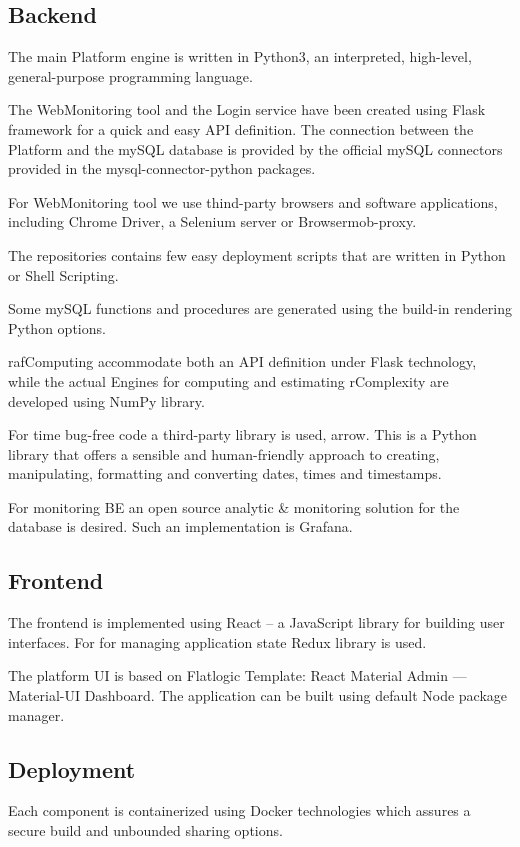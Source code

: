 \subsection{Backend}
The main Platform engine is written in Python3, an interpreted, high-level, general-purpose programming language.

The WebMonitoring tool and the Login service have been created using Flask framework for a quick and easy API definition. The connection between the Platform and the mySQL database is provided by the official mySQL connectors provided in the mysql-connector-python packages.

For WebMonitoring tool we use thind-party browsers and software applications, including Chrome Driver, a Selenium server or Browsermob-proxy.

The repositories contains few easy deployment scripts that are written in Python or Shell Scripting.

Some mySQL functions and procedures are generated using the build-in rendering Python options.

rafComputing accommodate both an API definition under Flask technology, while the actual Engines for computing and estimating rComplexity are developed using NumPy library.

For time bug-free code a third-party library is used, arrow. This is a Python library that offers a sensible and human-friendly approach to creating, manipulating, formatting and converting dates, times and timestamps.

For monitoring BE an open source analytic \& monitoring solution for the database is desired. Such an implementation is Grafana.

\subsection{Frontend}
The frontend is implemented using React – a JavaScript library for building user interfaces. 
For for managing application state Redux library is used.

The platform UI is based on Flatlogic Template: React Material Admin — Material-UI Dashboard. The application can be built using default Node package manager.

\subsection{Deployment}

Each component is containerized using Docker technologies which assures a secure build and unbounded sharing options.

